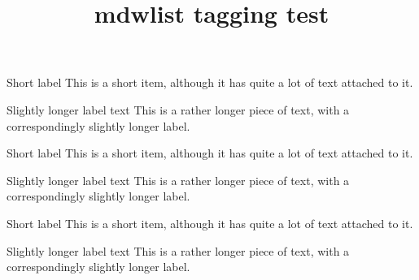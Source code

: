 \documentclass{article}
\title{mdwlist tagging test}
\begin{document}
\begin{basedescript}{\desclabelstyle{\nextlinelabel}}
\item [Short label] This is a short item, although it has quite a
lot of text attached to it.
\item [Slightly longer label text] This is a rather longer piece
of text, with a correspondingly slightly longer label.
\end{basedescript}
\medskip
\begin{basedescript}{\desclabelstyle{\multilinelabel}}
\item [Short label] This is a short item, although it has quite a
lot of text attached to it.
\item [Slightly longer label text] This is a rather longer piece
of text, with a correspondingly slightly longer label.
\end{basedescript}
\medskip
\begin{basedescript}{\desclabelstyle{\pushlabel}}
\item [Short label] This is a short item, although it has quite a
lot of text attached to it.
\item [Slightly longer label text] This is a rather longer piece
of text, with a correspondingly slightly longer label.
\end{basedescript}
\end{document}
